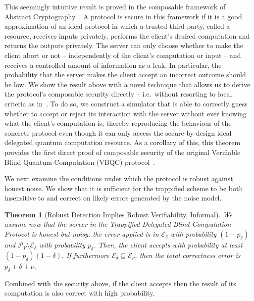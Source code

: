 \documentclass[12pt]{iopart}
\renewcommand{\1}{\mathds{1}}
\newtheorem{theorem}{Theorem}
\begin{document}
This seemingly intuitive result is proved in the composable framework of Abstract Cryptography~\cite{MR11:abstract-cryptography}. A protocol is secure in this framework if it is a good approximation of an ideal protocol in which a trusted third party, called a resource, receives inputs privately, performs the client's desired computation and returns the outputs privately. The server can only choose whether to make the client abort or not -- independently of the client's computation or input -- and receives a controlled amount of information as a leak. In particular, the probability that the server makes the client accept an incorrect outcome should be low. We show the result above with a novel technique that allows us to derive the protocol's composable security directly -- i.e.~without resorting to local criteria as in~\cite{DFPR14:composable}. To do so, we construct a simulator that is able to correctly guess whether to accept or reject its interaction with the server without ever knowing what the client's computation is, thereby reproducing the behaviour of the concrete protocol even though it can only access the secure-by-design ideal delegated quantum computation resource. As a corollary of this, this theorem provides the first direct proof of composable security of the original Verifiable Blind Quantum Computation (VBQC) protocol~\cite{FK17:unconditionally}.

We next examine the conditions under which the protocol is robust against honest noise. We show that it is sufficient for the trappified scheme to be both insensitive to and correct on likely errors generated by the noise model.

\begin{theorem}[Robust Detection Implies Robust Verifiability, Informal]
  We assume now that the server in the Trappified Delegated Blind Computation Protocol is honest-but-noisy: the error applied is in $\mathcal E_\delta$ with probability $(1-p_\delta)$ and $\mathcal{P}_V \setminus \mathcal E_\delta$ with probability $p_\delta$. 
  Then, the client accepts with probability at least $(1-p_\delta)(1-\delta)$. If furthermore $\mathcal{E}_\delta \subseteq \mathcal{E}_\nu$, then the total correctness error is $p_\delta + \delta + \nu$.
\end{theorem}
Combined with the security above, if the client accepts then the result of its computation is also correct with high probability.
\end{document}
